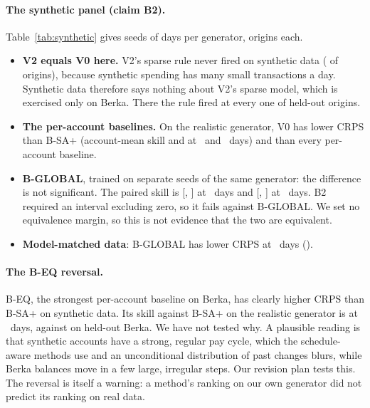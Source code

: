 \paragraph{The synthetic panel (claim B2).} Table~\ref{tab:synthetic}
gives  seeds of  days per generator,
 origins each.
\begin{itemize}
\item \textbf{V2 equals V0 here.} V2's sparse rule never fired on
  synthetic data ( of  origins), because
  synthetic spending has many small transactions a day. Synthetic data
  therefore says nothing about V2's sparse model, which is exercised only
  on Berka. There the rule fired at every one of 
  held-out origins.
\item \textbf{The per-account baselines.} On the realistic generator, V0
  has lower CRPS than B-SA+ (account-mean skill  and
   at \hB\ and \hC\ days) and than every
  per-account baseline.
\item \textbf{B-GLOBAL}, trained on  separate seeds of the
  same generator: the difference is not significant. The paired skill is
   [,
  ] at \hB\ days and
   [,
  ] at \hC\ days. B2 required an
  interval excluding zero, so it fails against B-GLOBAL. We set no
  equivalence margin, so this is not evidence that the two are
  equivalent.
\item \textbf{Model-matched data}: B-GLOBAL has lower CRPS at \hB\ days
  ().
\end{itemize}

\begin{table}[t]
\centering\footnotesize
{}
\caption{Synthetic panel:  seeds per generator,
 origins per method and horizon. Pooled
coverage (\%) and account(seed)-mean skill against B-SA+. V2's sparse rule
never fired, so V2 equals V0. V3 was not run on synthetic data.}
\label{tab:synthetic}
\end{table}

\paragraph{The B-EQ reversal.} B-EQ, the strongest per-account baseline on
Berka, has clearly higher CRPS than B-SA+ on synthetic data. Its skill
against B-SA+ on the realistic generator is  at
\hB\ days, against  on held-out Berka. We have
not tested why. A plausible reading is that synthetic accounts have a
strong, regular pay cycle, which the schedule-aware methods use and an
unconditional distribution of past changes blurs, while Berka balances
move in a few large, irregular steps. Our revision plan tests this. The
reversal is itself a warning: a method's ranking on our own generator did
not predict its ranking on real data.

